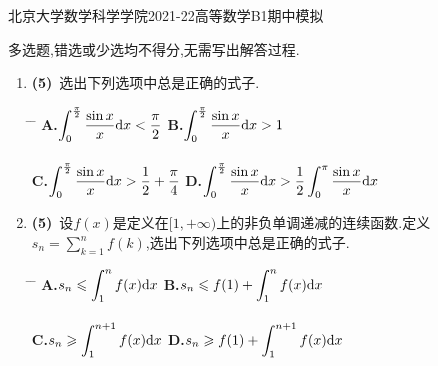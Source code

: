 \documentclass{ctexart}
\begin{document}
\pagestyle{empty}
\begin{center}\Large
    北京大学数学科学学院2021-22高等数学B1期中模拟
\end{center}
\begin{problem}[1.(10\songti{分})]
    多选题,错选或少选均不得分,无需写出解答过程.
    \begin{enumerate}[label=\textbf{(\arabic*)}]
        \item \textbf{(5)}\ 选出下列选项中总是正确的式子.
            \begin{tabbing}
                \hspace{0pt} \= \hspace{225pt} \= \hspace{225pt} \kill
                \> \textbf{A.}$\displaystyle\int_0^{\frac{\pi}{2}}\dfrac{\sin x}{x}\mathrm{d} x<\dfrac{\pi}{2}$
                \> \textbf{B.}$\displaystyle\int_0^{\frac{\pi}{2}}\dfrac{\sin x}{x}\mathrm{d} x>1$ \\\ \\
                \> \textbf{C.}$\displaystyle\int_0^{\frac{\pi}{2}}\dfrac{\sin x}{x}\mathrm{d} x>\dfrac{1}{2}+\dfrac{\pi}{4}$
                \> \textbf{D.}$\displaystyle\int_0^{\frac{\pi}{2}}\dfrac{\sin x}{x}\mathrm{d} x>\dfrac{1}{2}\displaystyle\int_0^{\pi}\dfrac{\sin x}{x}\mathrm{d} x$
            \end{tabbing}
        \item \textbf{(5)}\ 设$f(x)$是定义在$[1,+\infty)$上的非负单调递减的连续函数.定义$\displaystyle s_n=\sum_{k=1}^nf(k)$,选出下列选项中总是正确的式子.
            \begin{tabbing}
                \hspace{0pt} \= \hspace{225pt} \= \hspace{225pt} \kill
                \> \textbf{A.}$\displaystyle s_n\leqslant\int_1^nf(x)\mathrm{d} x$
                \> \textbf{B.}$\displaystyle s_n\leqslant f(1)+\int_1^nf(x)\mathrm{d} x$ \\\ \\
                \> \textbf{C.}$\displaystyle s_n\geqslant\int_1^{n+1}f(x)\mathrm{d} x$
                \> \textbf{D.}$\displaystyle s_n\geqslant f(1)+\int_1^{n+1}f(x)\mathrm{d} x$
            \end{tabbing}
    \end{enumerate}
\end{problem}
\end{document}

